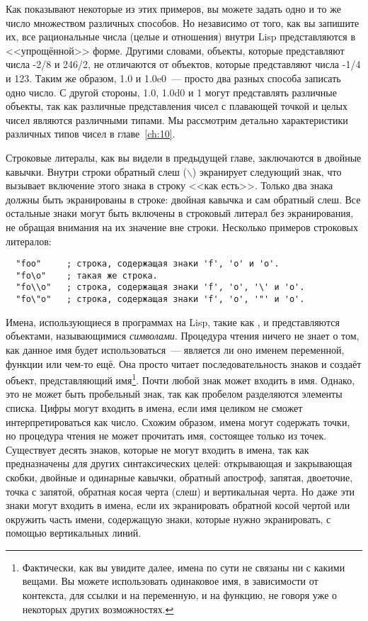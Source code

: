 Как показывают некоторые из этих примеров, вы можете задать одно и то же число множеством
различных способов. Но независимо от того, как вы запишите их, все рациональные числа
(целые и отношения) внутри Lisp представляются в <<упрощённой>> форме. Другими словами,
объекты, которые представляют числа -2/8 и 246/2, не отличаются от объектов, которые
представляют числа -1/4 и 123. Таким же образом, 1.0 и 1.0e0~--- просто два разных способа
записать одно число. С другой стороны, 1.0, 1.0d0 и 1 могут представлять различные
объекты, так как различные представления чисел с плавающей точкой и целых чисел являются
различными типами. Мы рассмотрим детально характеристики различных типов чисел в главе~\ref{ch:10}.

Строковые литералы, как вы видели в предыдущей главе, заключаются в двойные
кавычки. Внутри строки обратный слеш ($\backslash$) экранирует следующий знак, что
вызывает включение этого знака в строку <<как есть>>. Только два знака должны быть
экранированы в строке: двойная кавычка и сам обратный слеш. Все остальные знаки могут быть
включены в строковый литерал без экранирования, не обращая внимания на их значение вне
строки. Несколько примеров строковых литералов:

\begin{lstlisting}
  "foo"     ; строка, содержащая знаки 'f', 'o' и 'o'.
  "fo\o"    ; такая же строка.
  "fo\\o"   ; строка, содержащая знаки 'f', 'o', '\' и 'o'.
  "fo\"o"   ; строка, содержащая знаки 'f', 'o', '"' и 'o'.
\end{lstlisting}

Имена, использующиеся в программах на Lisp, такие как , 
и  представляются объектами, называющимися \textit{символами}. Процедура чтения
ничего не знает о том, как данное имя будет использоваться~--- является ли оно именем
переменной, функции или чем-то ещё. Она просто читает последовательность знаков и создаёт
объект, представляющий имя\footnote{Фактически, как вы увидите далее, имена по сути не
  связаны ни с какими вещами. Вы можете использовать одинаковое имя, в зависимости от
  контекста, для ссылки и на переменную, и на функцию, не говоря уже о некоторых других
  возможностях.}. Почти любой знак может входить в имя. Однако, это не может быть
пробельный знак, так как пробелом разделяются элементы списка. Цифры могут входить в
имена, если имя целиком не сможет интерпретироваться как число. Схожим образом, имена
могут содержать точки, но процедура чтения не может прочитать имя, состоящее только из
точек. Существует десять знаков, которые не могут входить в имена, так как предназначены
для других синтаксических целей: открывающая и закрывающая скобки, двойные и одинарные
кавычки, обратный апостроф, запятая, двоеточие, точка с запятой, обратная косая черта
(слеш) и вертикальная черта. Но даже эти знаки могут входить в имена, если их экранировать
обратной косой чертой или окружить часть имени, содержащую знаки, которые нужно
экранировать, с помощью вертикальных линий.

